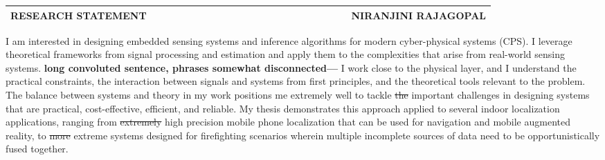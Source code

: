 \documentclass[10pt]{article}
\date{}
\begin{document}


\begin{table}
\color{blue}
\begin{tabular*}{\textwidth}{l r}
\large\textbf{RESEARCH STATEMENT} & 
\hfill \ \ \ \ \ \ \ \ \ \ \ \ \ \ \ \ \ \ \ \
\ \ \ \ \ \ \ \ \ \ \ \ \ \ \
\large\textbf{NIRANJINI RAJAGOPAL}\\
\hline
\end{tabular*}

\end{table}
 
I am interested in designing embedded sensing systems and inference
algorithms for modern cyber-physical systems (CPS).  I leverage
theoretical frameworks from signal processing and estimation and apply
them to the complexities that arise from real-world sensing systems.
{\bf long convoluted sentence, phrases somewhat disconnected--- } I work
close to the physical layer, and I understand the practical
constraints, the interaction between signals and systems from first
principles, and the theoretical tools relevant to the problem.  The
balance between systems and theory in my work positions me extremely
well to tackle \st{the} important challenges in designing systems that are
practical, cost-effective, efficient, and reliable. My thesis
demonstrates this approach applied to several indoor localization
applications, ranging from \st{extremely} high precision mobile phone localization
that can be used for navigation and mobile augmented reality, to \st{more}
extreme systems designed for firefighting scenarios wherein multiple
incomplete sources of data need to be opportunistically fused
together.

\end{document}
